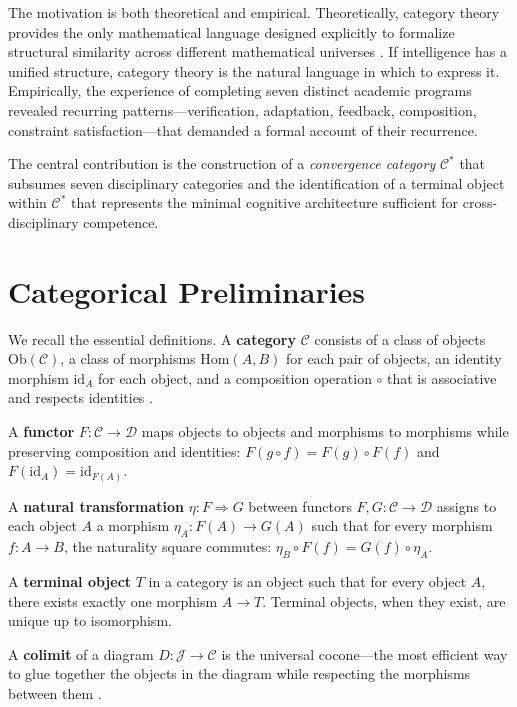 \documentclass[11pt,a4paper]{article}
\begin{document}
The motivation is both theoretical and empirical. Theoretically, category theory provides the only mathematical language designed explicitly to formalize structural similarity across different mathematical universes \citep{eilenberg1945general, maclane1971categories}. If intelligence has a unified structure, category theory is the natural language in which to express it. Empirically, the experience of completing seven distinct academic programs revealed recurring patterns---verification, adaptation, feedback, composition, constraint satisfaction---that demanded a formal account of their recurrence.

The central contribution is the construction of a \emph{convergence category} $\mathcal{C}^*$ that subsumes seven disciplinary categories and the identification of a terminal object within $\mathcal{C}^*$ that represents the minimal cognitive architecture sufficient for cross-disciplinary competence.

\section{Categorical Preliminaries}
\label{sec:prelim}

We recall the essential definitions. A \textbf{category} $\mathcal{C}$ consists of a class of objects $\mathrm{Ob}(\mathcal{C})$, a class of morphisms $\mathrm{Hom}(A,B)$ for each pair of objects, an identity morphism $\mathrm{id}_A$ for each object, and a composition operation $\circ$ that is associative and respects identities \citep{maclane1971categories}.

A \textbf{functor} $F: \mathcal{C} \to \mathcal{D}$ maps objects to objects and morphisms to morphisms while preserving composition and identities: $F(g \circ f) = F(g) \circ F(f)$ and $F(\mathrm{id}_A) = \mathrm{id}_{F(A)}$.

A \textbf{natural transformation} $\eta: F \Rightarrow G$ between functors $F, G: \mathcal{C} \to \mathcal{D}$ assigns to each object $A$ a morphism $\eta_A: F(A) \to G(A)$ such that for every morphism $f: A \to B$, the naturality square commutes: $\eta_B \circ F(f) = G(f) \circ \eta_A$.

A \textbf{terminal object} $T$ in a category is an object such that for every object $A$, there exists exactly one morphism $A \to T$. Terminal objects, when they exist, are unique up to isomorphism.

A \textbf{colimit} of a diagram $D: \mathcal{J} \to \mathcal{C}$ is the universal cocone---the most efficient way to glue together the objects in the diagram while respecting the morphisms between them \citep{borceux1994handbook}.
\end{document}
